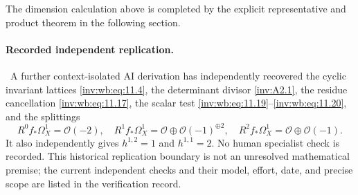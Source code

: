 The dimension calculation above is completed by the explicit representative
and product theorem in the following section.


\paragraph{Recorded independent replication.}
\label{wb:record:h12-direct-images}
\ A further context-isolated AI derivation has independently recovered
the cyclic invariant lattices \eqref{inv:wb:eq:11.4}, the determinant divisor \cref{inv:A2.1}, the
residue cancellation \eqref{inv:wb:eq:11.17}, the scalar test \eqref{inv:wb:eq:11.19}--\eqref{inv:wb:eq:11.20}, and the
splittings
\[
 R^0f_*\Omega_X^1=\mathcal O(-2),\quad
 R^1f_*\Omega_X^1=\mathcal O\oplus\mathcal O(-1)^{\oplus2},\quad
 R^2f_*\Omega_X^1=\mathcal O\oplus\mathcal O(-1).
\]
It also independently gives $h^{1,2}=1$ and $h^{1,1}=2$.  No human specialist check is recorded. This historical replication boundary is not an unresolved mathematical premise; the current independent checks and their model, effort, date, and precise scope are listed in the verification record.


